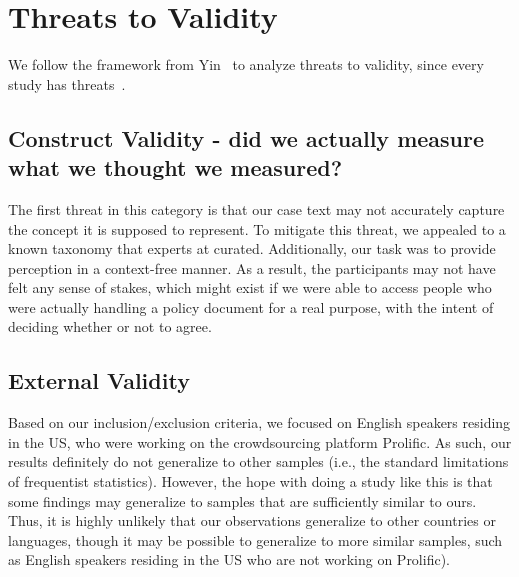 \section{Threats to Validity
}

We follow the framework from Yin~\cite{yinBook} to analyze threats to validity, since every study has threats~\cite{Wohlin-2012}.

\subsection{Construct Validity - did we actually measure what we thought we measured?}

The first threat in this category is that our case text may not accurately capture the concept it is supposed to represent.
To mitigate this threat, we appealed to a known taxonomy that experts at \tosdr{} curated.
Additionally, our task was to provide perception in a context-free manner.
As a result, the participants may not have felt any sense of stakes, which might exist if we were able to access people who were actually handling a policy document for a real purpose, with the intent of deciding whether or not to agree.

\subsection{External Validity}

Based on our inclusion/exclusion criteria, we focused on English speakers residing in the US, who were working on the crowdsourcing platform Prolific.
As such, our results definitely do not generalize to other samples (i.e., the standard limitations of frequentist statistics).
However, the hope with doing a study like this is that some findings may generalize to samples that are sufficiently similar to ours.
Thus, it is highly unlikely that our observations generalize to other countries or languages, though it may be possible to generalize to more similar samples, such as English speakers residing in the US who are not working on Prolific).

